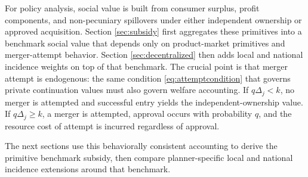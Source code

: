 For policy analysis, social value is built from consumer surplus, profit components, and non-pecuniary spillovers under either independent ownership or approved acquisition. Section \ref{sec:subsidy} first aggregates these primitives into a benchmark social value that depends only on product-market primitives and merger-attempt behavior. Section \ref{sec:decentralized} then adds local and national incidence weights on top of that benchmark. The crucial point is that merger attempt is endogenous: the same condition \eqref{eq:attemptcondition} that governs private continuation values must also govern welfare accounting. If \(q\Delta_j<k\), no merger is attempted and successful entry yields the independent-ownership value. If \(q\Delta_j \ge k\), a merger is attempted, approval occurs with probability \(q\), and the resource cost of attempt is incurred regardless of approval.

The next sections use this behaviorally consistent accounting to derive the primitive benchmark subsidy, then compare planner-specific local and national incidence extensions around that benchmark.
